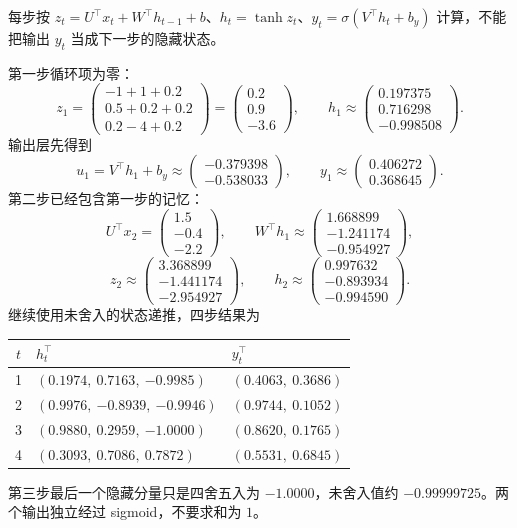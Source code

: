 \begin{workedsolution}
每步按 $z_t=U^\top x_t+W^\top h_{t-1}+b$、$h_t=\tanh z_t$、$y_t=\sigma(V^\top h_t+b_y)$ 计算，不能把输出 $y_t$ 当成下一步的隐藏状态。

第一步循环项为零：
\[
 z_1=\begin{pmatrix}-1+1+0.2\\0.5+0.2+0.2\\0.2-4+0.2\end{pmatrix}
    =\begin{pmatrix}0.2\\0.9\\-3.6\end{pmatrix},\qquad
 h_1\approx\begin{pmatrix}0.197375\\0.716298\\-0.998508\end{pmatrix}.
\]
输出层先得到
\[
 u_1=V^\top h_1+b_y\approx
 \begin{pmatrix}-0.379398\\-0.538033\end{pmatrix},\qquad
 y_1\approx\begin{pmatrix}0.406272\\0.368645\end{pmatrix}.
\]
第二步已经包含第一步的记忆：
\[
 U^\top x_2=\begin{pmatrix}1.5\\-0.4\\-2.2\end{pmatrix},\qquad
 W^\top h_1\approx\begin{pmatrix}1.668899\\-1.241174\\-0.954927\end{pmatrix},
\]
\[
 z_2\approx\begin{pmatrix}3.368899\\-1.441174\\-2.954927\end{pmatrix},\qquad
 h_2\approx\begin{pmatrix}0.997632\\-0.893934\\-0.994590\end{pmatrix}.
\]
继续使用未舍入的状态递推，四步结果为
\begin{center}
\small
\begin{tabular}{@{}cll@{}}
\toprule
$t$ & $h_t^\top$ & $y_t^\top$ \\
\midrule
1 & $(0.1974,\ 0.7163,\ {-0.9985})$ & $(0.4063,\ 0.3686)$ \\
2 & $(0.9976,\ {-0.8939},\ {-0.9946})$ & $(0.9744,\ 0.1052)$ \\
3 & $(0.9880,\ 0.2959,\ {-1.0000})$ & $(0.8620,\ 0.1765)$ \\
4 & $(0.3093,\ 0.7086,\ 0.7872)$ & $(0.5531,\ 0.6845)$ \\
\bottomrule
\end{tabular}
\end{center}
第三步最后一个隐藏分量只是四舍五入为 $-1.0000$，未舍入值约 $-0.99999725$。两个输出独立经过 sigmoid，不要求和为 $1$。


\end{workedsolution}
